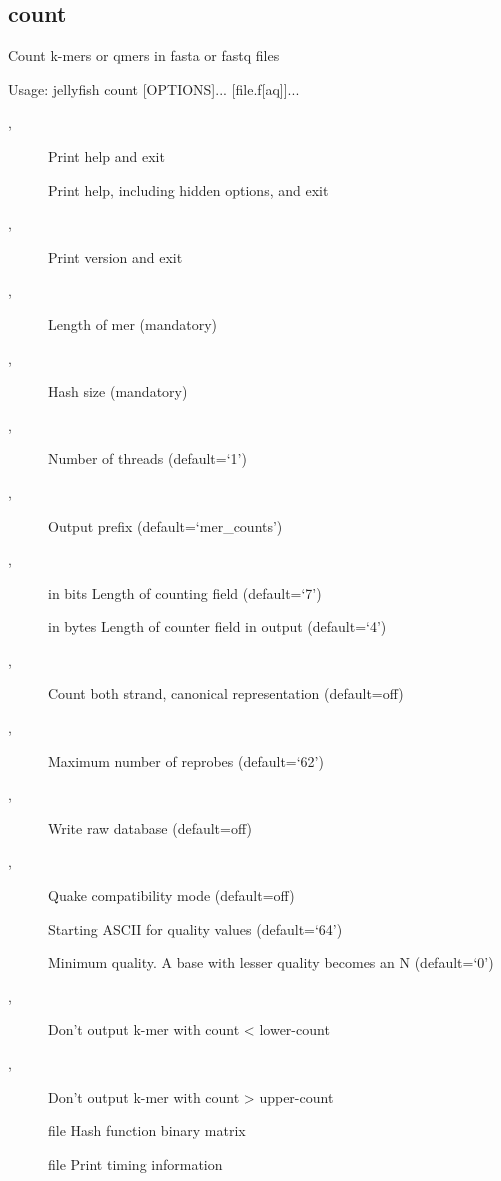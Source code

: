\subsection{count}

Count k-mers or qmers in fasta or fastq files

Usage: jellyfish count [OPTIONS]... [file.f[aq]]...

\begin{description}
\item[,] Print help and exit
\item[] Print help, including hidden options, and exit
\item[,] Print version and exit
\item[,] Length of mer (mandatory)
\item[,] Hash size (mandatory)
\item[,] Number of threads  (default=`1')
\item[,] Output prefix  (default=`mer\_counts')
\item[,] in bits
Length of counting field  (default=`7')
\item[] in bytes
Length of counter field in output  
(default=`4')
\item[,] Count both strand, canonical representation  
(default=off)
\item[,] Maximum number of reprobes  (default=`62')
\item[,] Write raw database  (default=off)
\item[,] Quake compatibility mode  (default=off)
\item[] Starting ASCII for quality values  
(default=`64')
\item[] Minimum quality. A base with lesser quality 
becomes an N  (default=`0')
\item[,] Don't output k-mer with count < lower-count
\item[,] Don't output k-mer with count > upper-count
\item[] file      Hash function binary matrix
\item[] file      Print timing information
\end{description}
